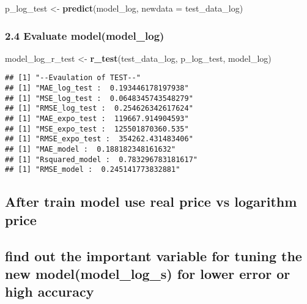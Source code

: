 \documentclass[
]{article}
\newenvironment{Shaded}{\begin{snugshade}}{\end{snugshade}}
\newcommand{\AttributeTok}[1]{\textcolor[rgb]{0.13,0.29,0.53}{#1}}
\newcommand{\FunctionTok}[1]{\textcolor[rgb]{0.13,0.29,0.53}{\textbf{#1}}}
\newcommand{\NormalTok}[1]{#1}
\newcommand{\OtherTok}[1]{\textcolor[rgb]{0.56,0.35,0.01}{#1}}
\begin{document}
\begin{Shaded}
\begin{Highlighting}[]
\NormalTok{p\_log\_test }\OtherTok{\textless{}{-}} \FunctionTok{predict}\NormalTok{(model\_log, }\AttributeTok{newdata =}\NormalTok{ test\_data\_log)}
\end{Highlighting}
\end{Shaded}

\hypertarget{evaluate-modelmodel_log}{%
\subsubsection{2.4 Evaluate
model(model\_log)}\label{evaluate-modelmodel_log}}

\begin{Shaded}
\begin{Highlighting}[]
\NormalTok{model\_log\_r\_test }\OtherTok{\textless{}{-}} \FunctionTok{r\_test}\NormalTok{(test\_data\_log, p\_log\_test, model\_log)}
\end{Highlighting}
\end{Shaded}

\begin{verbatim}
## [1] "--Evaulation of TEST--"
## [1] "MAE_log_test :  0.193446178197938"
## [1] "MSE_log_test :  0.0648345743548279"
## [1] "RMSE_log_test :  0.254626342617624"
## [1] "MAE_expo_test :  119667.914904593"
## [1] "MSE_expo_test :  125501870360.535"
## [1] "RMSE_expo_test :  354262.431483406"
## [1] "MAE_model :  0.188182348161632"
## [1] "Rsquared_model :  0.783296783181617"
## [1] "RMSE_model :  0.245141773832881"
\end{verbatim}

\hypertarget{after-train-model-use-real-price-vs-logarithm-price}{%
\subsection{After train model use real price vs logarithm
price}\label{after-train-model-use-real-price-vs-logarithm-price}}

\hypertarget{find-out-the-important-variable-for-tuning-the-new-modelmodel_log_s-for-lower-error-or-high-accuracy}{%
\subsection{find out the important variable for tuning the new
model(model\_log\_s) for lower error or high
accuracy}\label{find-out-the-important-variable-for-tuning-the-new-modelmodel_log_s-for-lower-error-or-high-accuracy}}
\end{document}
